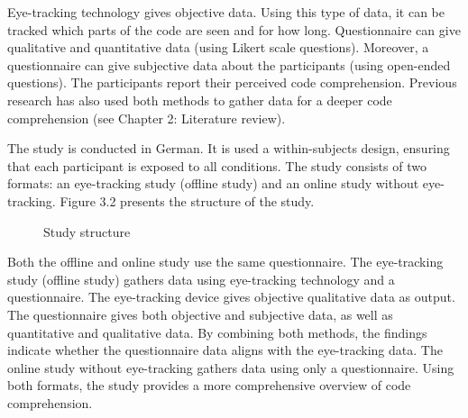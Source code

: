  

Eye-tracking technology gives objective data. Using this type of data, it can be tracked which parts of the code are seen and for how long. Questionnaire can give qualitative and quantitative data (using Likert scale questions). Moreover, a questionnaire can give subjective data about the participants (using open-ended questions). The participants report their perceived code comprehension.  
Previous research has also used both methods to gather data for a deeper code comprehension (see Chapter 2: Literature review). 


The study is conducted in German. It is used a within-subjects design, ensuring that each participant is exposed to all conditions.
The study consists of two formats: an eye-tracking study (offline study) and an online study without eye-tracking. Figure 3.2 presents the structure of the study. 
\begin{figure}[H]
  \centering
  \caption{Study structure}
  \label{fig:AnhangsChor}

\end{figure}


Both the offline and online study use the same questionnaire. The eye-tracking study (offline study) gathers data using eye-tracking technology and a questionnaire. The eye-tracking device gives objective qualitative data as output. The questionnaire gives both objective and subjective data, as well as quantitative and qualitative data.  By combining both methods, the findings indicate whether the questionnaire data aligns with the eye-tracking data.
The online study without eye-tracking gathers data using only a questionnaire.  Using both formats, the study provides a more comprehensive overview of code comprehension. 




